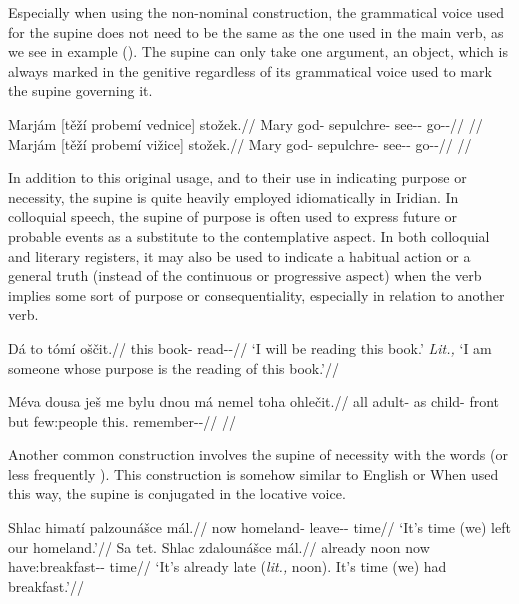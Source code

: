 Especially when using the non-nominal construction, the grammatical voice used
for the supine does not need to be the same as the one used in the main verb, as
we see in example (). The supine can only take one
argument, an object, which is always marked in the genitive regardless of its
grammatical voice used to mark the supine governing it.

\pex
\a\begingl
\gla Marjám [těží probemí vednice] stožek.//
\glb Mary god-\Gen{} sepulchre-\Gen{} see-\Pv{}-\SupP{} go-\Av{}-\Pf{}//
\glft {}//
\endgl
\a\begingl
\gla Marjám [těží probemí vižice] stožek.//
\glb Mary god-\Gen{} sepulchre-\Gen{} see-\Av{}-\SupP{} go-\Av{}-\Pf{}//
\glft {}//
\endgl
\xe

In addition to this original usage, and to their use in indicating purpose or
necessity, the supine is quite heavily employed idiomatically in
Iridian. In colloquial speech, the supine of purpose is often used to express
future or probable events as a substitute to the contemplative aspect. In both
colloquial and literary registers, it may also be used to indicate a habitual
action or a general truth (instead of the continuous or progressive aspect) when
the verb implies some sort of purpose or consequentiality, especially in
relation to another verb.

\pex
\begingl
\gla Dá to tómí oščit.//
\glb \First{}\Sg{} this book-\Gen{} read-\Av{}-\SupP{}//
\glft `I will be reading this book.' \emph{Lit.,} `I am someone whose purpose is the reading of this book.'//
\endgl
\xe

\pex
\begingl
\gla Méva dousa ješ me bylu dnou má nemel toha ohlečit.//
\glb all adult-\Acc{} \Exst{} as child-\Ins{} front but few:people this.\Acc{} remember-\Av{}-\SupP{}//
\glft {}//
\endgl
\xe

Another common construction involves the supine of necessity with the words
  (or less frequently ). This
construction is somehow similar to English  or  When used this way, the supine is
conjugated in the locative voice.

\pex
\begingl
\gla Shlac himatí palzounášce mál.//
\glb now homeland-\Gen{} leave-\Lv{}-\SupN{} time//
\glft `It's time (we) left our homeland.'//
\endgl
\xe
\pex
\begingl
\gla Sa tet. Shlac zdalounášce mál.//
\glb already noon now have:breakfast-\Lv{}-\SupN{} time//
\glft `It's already late (\emph{lit.,} noon). It's time (we) had breakfast.'//
\endgl
\xe

